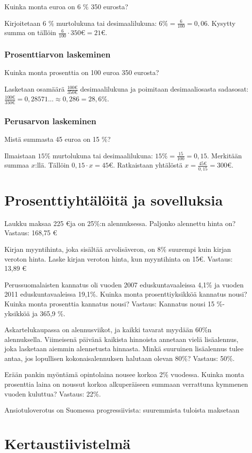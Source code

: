 Kuinka monta euroa on 6 $\%$ 350 eurosta?

Kirjoitetaan 6 $\%$ murtolukuna tai desimaalilukuna: $6 \% = \frac{6}{100} = 0,06$. Kysytty summa on tällöin $\frac{6}{100} \cdot 350 \euro = 21 \euro$.

\subsection{Prosenttiarvon laskeminen}

Kuinka monta prosenttia on 100 euroa 350 eurosta?

Lasketaan osamäärä $\frac{100 \euro}{350 \euro}$ desimaalilukuna ja poimitaan desimaaliosasta sadasosat: $\frac{100 \euro}{350 \euro} = 0,28571 \ldots \approx 0,286 = 28,6 \%$.

\subsection{Perusarvon laskeminen}

Mistä summasta 45 euroa on 15 $\%$?

Ilmaistaan $15 \%$ murtolukuna tai desimaalilukuna: $15 \% = \frac{15}{100} = 0,15$. Merkitään summaa $x$:llä. Tällöin $0,15 \cdot x = 45 \euro$. Ratkaistaan yhtälöstä $x = \frac{45 \euro}{0,15} = 300 \euro$.

\chapter{Prosenttiyhtälöitä ja sovelluksia}

Laukku maksaa 225 \euro ja on 25\%:n alennuksessa. Paljonko alennettu hinta on?
Vastaus: 168,75 \euro

Kirjan myyntihinta, joka sisältää arvolisäveron, on 8\% suurempi kuin kirjan veroton hinta. Laske kirjan veroton hinta, kun myyntihinta on 15\euro.
Vastaus: 13,89 \euro

Perussuomalaisten kannatus oli vuoden 2007 eduskuntavaaleissa 4,1\% ja vuoden 2011 eduskuntavaaleissa 19,1\%. Kuinka monta prosenttiyksikköä kannatus nousi? Kuinka monta prosenttia kannatus nousi?
Vastaus: Kannatus nousi 15 \%-yksikköä ja 365,9 \%.

Askartelukaupassa on alennusviikot, ja kaikki tavarat myydään 60\%n alennuksella. Viimeisenä päivänä kaikista hinnoista annetaan vielä lisäalennus, joka lasketaan aiemmin alennetusta hinnasta. Minkä suuruinen lisäalennus tulee antaa, jos lopullisen kokonaisalennuksen halutaan olevan 80\%?
Vastaus: 50\%.

Erään pankin myöntämä opintolaina nousee korkoa 2\% vuodessa. Kuinka monta prosenttia laina on noussut korkoa alkuperäiseen summaan verrattuna kymmenen vuoden kuluttua?
Vastaus: 22\%.

Ansiotuloverotus on Suomessa progressiivista: suuremmista tuloista maksetaan

%
%
\chapter{Kertaustiivistelmä}
